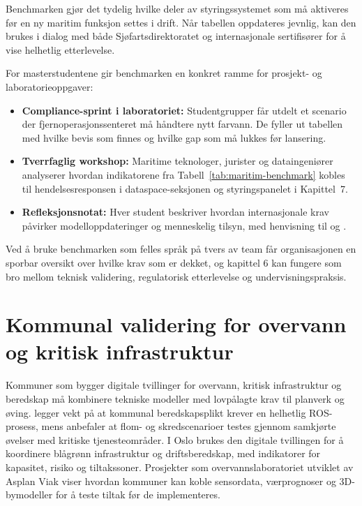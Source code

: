 Benchmarken gjør det tydelig hvilke deler av styringssystemet som må aktiveres før en ny maritim funksjon settes i drift. Når tabellen oppdateres jevnlig, kan den brukes i dialog med både Sjøfartsdirektoratet og internasjonale sertifisører for å vise helhetlig etterlevelse.

For masterstudentene gir benchmarken en konkret ramme for prosjekt- og laboratorieoppgaver:
\begin{itemize}
    \item \textbf{Compliance-sprint i laboratoriet:} Studentgrupper får utdelt et scenario der fjernoperasjonssenteret må håndtere nytt farvann. De fyller ut tabellen med hvilke bevis som finnes og hvilke gap som må lukkes før lansering.
    \item \textbf{Tverrfaglig workshop:} Maritime teknologer, jurister og dataingeniører analyserer hvordan indikatorene fra Tabell~\ref{tab:maritim-benchmark} kobles til hendelsesresponsen i dataspace-seksjonen og styringspanelet i Kapittel~7.
    \item \textbf{Refleksjonsnotat:} Hver student beskriver hvordan internasjonale krav påvirker modelloppdateringer og menneskelig tilsyn, med henvisning til \citet{imo2023masscode} og \citet{emsa2024remote}.
\end{itemize}

Ved å bruke benchmarken som felles språk på tvers av team får organisasjonen en sporbar oversikt over hvilke krav som er dekket, og kapittel 6 kan fungere som bro mellom teknisk validering, regulatorisk etterlevelse og undervisningspraksis.

\section{Kommunal validering for overvann og kritisk infrastruktur}
Kommuner som bygger digitale tvillinger for overvann, kritisk infrastruktur og beredskap må kombinere tekniske modeller med lovpålagte krav til planverk og øving. \citet{dsb2022beredskap} legger vekt på at kommunal beredskapsplikt krever en helhetlig ROS-prosess, mens \citet{nve2022kommunal} anbefaler at flom- og skredscenarioer testes gjennom samkjørte øvelser med kritiske tjenesteområder. I Oslo brukes den digitale tvillingen for å koordinere blågrønn infrastruktur og driftsberedskap, med indikatorer for kapasitet, risiko og tiltakssoner.\citep{oslo2023overvann} Prosjekter som overvannslaboratoriet utviklet av Asplan Viak viser hvordan kommuner kan koble sensordata, værprognoser og 3D-bymodeller for å teste tiltak før de implementeres.\citep{asplan2023overvannslab}

